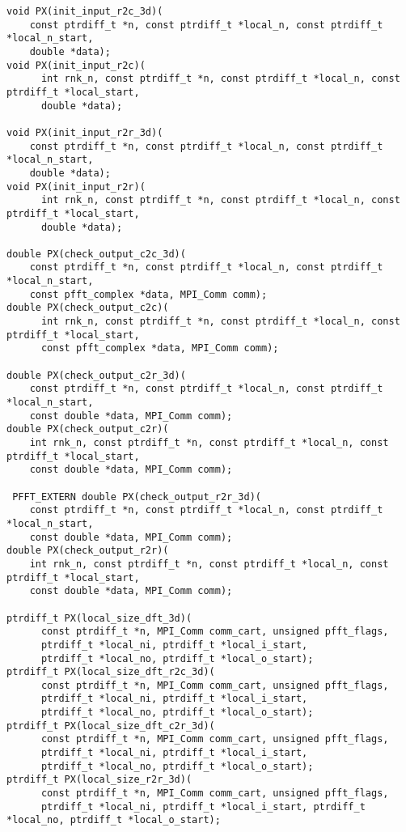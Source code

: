 \begin{lstlisting}
void PX(init_input_r2c_3d)(
    const ptrdiff_t *n, const ptrdiff_t *local_n, const ptrdiff_t *local_n_start,
    double *data);
void PX(init_input_r2c)(
      int rnk_n, const ptrdiff_t *n, const ptrdiff_t *local_n, const ptrdiff_t *local_start,
      double *data);

void PX(init_input_r2r_3d)(
    const ptrdiff_t *n, const ptrdiff_t *local_n, const ptrdiff_t *local_n_start,
    double *data);
void PX(init_input_r2r)(
      int rnk_n, const ptrdiff_t *n, const ptrdiff_t *local_n, const ptrdiff_t *local_start,
      double *data);

double PX(check_output_c2c_3d)(
    const ptrdiff_t *n, const ptrdiff_t *local_n, const ptrdiff_t *local_n_start,
    const pfft_complex *data, MPI_Comm comm);
double PX(check_output_c2c)(
      int rnk_n, const ptrdiff_t *n, const ptrdiff_t *local_n, const ptrdiff_t *local_start,
      const pfft_complex *data, MPI_Comm comm);

double PX(check_output_c2r_3d)(
    const ptrdiff_t *n, const ptrdiff_t *local_n, const ptrdiff_t *local_n_start,
    const double *data, MPI_Comm comm);
double PX(check_output_c2r)(
    int rnk_n, const ptrdiff_t *n, const ptrdiff_t *local_n, const ptrdiff_t *local_start,
    const double *data, MPI_Comm comm);

 PFFT_EXTERN double PX(check_output_r2r_3d)(
    const ptrdiff_t *n, const ptrdiff_t *local_n, const ptrdiff_t *local_n_start,
    const double *data, MPI_Comm comm);
double PX(check_output_r2r)(
    int rnk_n, const ptrdiff_t *n, const ptrdiff_t *local_n, const ptrdiff_t *local_start,
    const double *data, MPI_Comm comm);

ptrdiff_t PX(local_size_dft_3d)(
      const ptrdiff_t *n, MPI_Comm comm_cart, unsigned pfft_flags,
      ptrdiff_t *local_ni, ptrdiff_t *local_i_start,
      ptrdiff_t *local_no, ptrdiff_t *local_o_start);
ptrdiff_t PX(local_size_dft_r2c_3d)(
      const ptrdiff_t *n, MPI_Comm comm_cart, unsigned pfft_flags,
      ptrdiff_t *local_ni, ptrdiff_t *local_i_start,
      ptrdiff_t *local_no, ptrdiff_t *local_o_start);
ptrdiff_t PX(local_size_dft_c2r_3d)(
      const ptrdiff_t *n, MPI_Comm comm_cart, unsigned pfft_flags,
      ptrdiff_t *local_ni, ptrdiff_t *local_i_start,
      ptrdiff_t *local_no, ptrdiff_t *local_o_start);
ptrdiff_t PX(local_size_r2r_3d)(
      const ptrdiff_t *n, MPI_Comm comm_cart, unsigned pfft_flags,
      ptrdiff_t *local_ni, ptrdiff_t *local_i_start, ptrdiff_t *local_no, ptrdiff_t *local_o_start);


\end{lstlisting}
